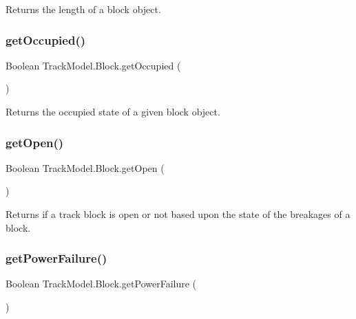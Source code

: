 Returns the length of a block object. 

\mbox{\label{classTrackModel_1_1Block_abd32beccef518c0e4622b2df1fd4ed54}} 
\subsubsection{\texorpdfstring{get\+Occupied()}{getOccupied()}}
{\footnotesize\ttfamily Boolean Track\+Model.\+Block.\+get\+Occupied (\begin{DoxyParamCaption}{ }\end{DoxyParamCaption})}



Returns the occupied state of a given block object. 

\mbox{\label{classTrackModel_1_1Block_a5488f8e2329f780616c0189d31269a85}} 
\subsubsection{\texorpdfstring{get\+Open()}{getOpen()}}
{\footnotesize\ttfamily Boolean Track\+Model.\+Block.\+get\+Open (\begin{DoxyParamCaption}{ }\end{DoxyParamCaption})}



Returns if a track block is open or not based upon the state of the breakages of a block. 

\mbox{\label{classTrackModel_1_1Block_abcfeb805be53d52f8034ba3eb629299d}} 
\subsubsection{\texorpdfstring{get\+Power\+Failure()}{getPowerFailure()}}
{\footnotesize\ttfamily Boolean Track\+Model.\+Block.\+get\+Power\+Failure (\begin{DoxyParamCaption}{ }\end{DoxyParamCaption})}

